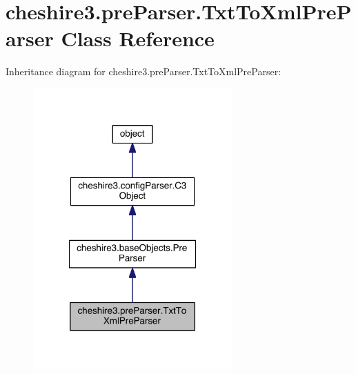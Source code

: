 \hypertarget{classcheshire3_1_1pre_parser_1_1_txt_to_xml_pre_parser}{\section{cheshire3.\-pre\-Parser.\-Txt\-To\-Xml\-Pre\-Parser Class Reference}
\label{classcheshire3_1_1pre_parser_1_1_txt_to_xml_pre_parser}
}


Inheritance diagram for cheshire3.\-pre\-Parser.\-Txt\-To\-Xml\-Pre\-Parser\-:
\nopagebreak
\begin{figure}[H]
\begin{center}
\leavevmode
\includegraphics[width=216pt]{classcheshire3_1_1pre_parser_1_1_txt_to_xml_pre_parser__inherit__graph}
\end{center}
\end{figure}


